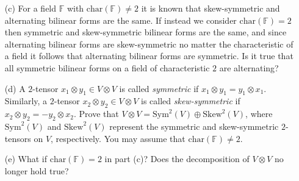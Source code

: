 \documentclass[12pt]{article}
\begin{document}
\begin{itemize}
\begin{itemize}
    \vspace{.3cm}
    \item[(c)]
    For a field $\mathbb{F}$ with $\text{char}(\mathbb{F}) \neq 2$ it is known that skew-symmetric and alternating bilinear forms are the same. If instead we consider $\text{char}(\mathbb{F}) = 2$ then symmetric and skew-symmetric bilinear forms are the same, and since alternating bilinear forms are skew-symmetric no matter the characteristic of a field it follows that alternating bilinear forms are symmetric. Is it true that all symmetric bilinear forms on a field of characteristic $2$ are alternating?
    
    \vspace{.3cm}
    \item[(d)]
    A $2$-tensor $x_1 \otimes y_1 \in V \otimes V$ is called \textit{symmetric} if $x_1 \otimes y_1 = y_1 \otimes x_1$. Similarly, a $2$-tensor $x_2 \otimes y_2 \in V \otimes V$ is called \textit{skew-symmetric} if $x_2 \otimes y_2 = -y_2 \otimes x_2$. Prove that $V \otimes V = \text{Sym}^2(V) \oplus \text{Skew}^2(V)$, where $\text{Sym}^2(V)$ and $\text{Skew}^2(V)$ represent the symmetric and skew-symmetric $2$-tensors on $V$, respectively. You may assume that $\text{char}(\mathbb{F}) \neq 2$.
    
    \vspace{.3cm}
    \item[(e)]
    What if $\text{char}(\mathbb{F}) = 2$ in part (c)? Does the decomposition of $V \otimes V$ no longer hold true?
    
    \end{itemize}
    
    \end{itemize}
\end{document}
